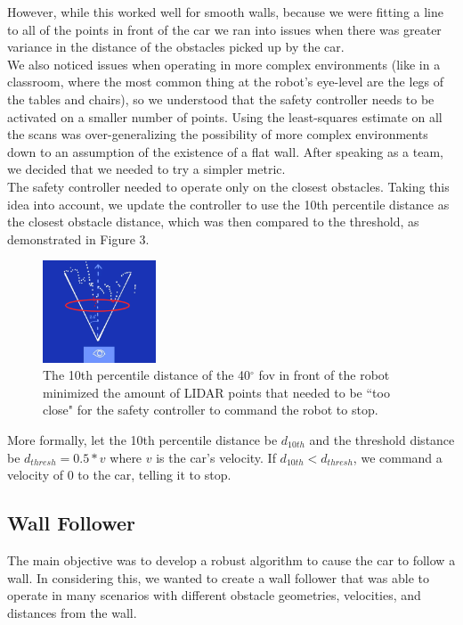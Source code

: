 \documentclass{article}
\begin{document}
However, while this worked well for smooth walls, because we were fitting a line to all of the points in front of the car we ran into issues when there was greater variance in the distance of the obstacles picked up by the car.\\

We also noticed issues when operating in more complex environments (like in a classroom, where the most common thing at the robot's eye-level are the legs of the tables and chairs), so we understood that the safety controller needs to be activated on a smaller number of points. Using the least-squares estimate on all the scans was over-generalizing the possibility of more complex environments down to an assumption of the existence of a flat wall. After speaking as a team, we decided that we needed to try a simpler metric. \\

The safety controller needed to operate only on the closest obstacles. Taking this idea into account, we update the controller to use the 10th percentile distance as the closest obstacle distance, which was then compared to the threshold, as demonstrated in Figure 3.
\begin{figure}[!h]
\begin{center}
\includegraphics[width=0.3\textwidth]{safety_10th.png}
\caption{The 10th percentile distance of the 40$^\circ$ fov in front of the robot minimized the amount of LIDAR points that needed to be ``too close" for the safety controller to command the robot to stop.}
\end{center}
\end{figure}

More formally, let the 10th percentile distance be $d_{10th}$ and the threshold distance be $d_{thresh} = 0.5 * v$ where $v$ is the car's velocity. If $d_{10th} < d_{thresh}$, we command a velocity of 0 to the car, telling it to stop.

\subsection{Wall Follower}
The main objective was to develop a robust algorithm to cause the car to follow a wall. In considering this, we wanted to create a wall follower that was able to operate in many scenarios with different obstacle geometries, velocities, and distances from the wall.\\
\end{document}
